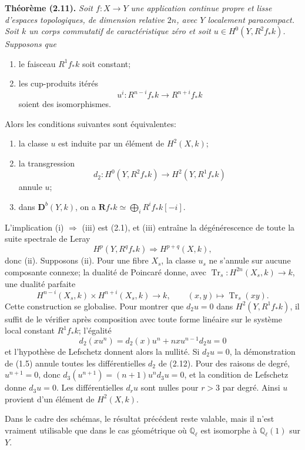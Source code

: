 \documentclass[11pt]{article}
\DeclareMathOperator{\Tr}{Tr}
\newcommand{\bD}{\mathbf D}
\newcommand{\bR}{\mathbf R}
\newcommand{\Ql}{\mathbb Q_\ell}
\newenvironment{named}[1]{\par\medskip\noindent\textbf{#1}\itshape}{\par\medskip}
\begin{document}
\begin{named}{Théorème (2.11).}
Soit $f:X\to Y$ une application continue propre et lisse d'espaces topologiques, de dimension relative $2n$, avec $Y$ localement paracompact. Soit $k$ un corps commutatif de caractéristique zéro et soit $u\in H^0(Y,R^2f_*k)$. Supposons que
\begin{enumerate}[label=\alph*)]
\item le faisceau $R^1f_*k$ soit constant;
\item les cup-produits itérés
\[
u^i:R^{n-i}f_*k\longrightarrow R^{n+i}f_*k
\]
soient des isomorphismes.
\end{enumerate}
Alors les conditions suivantes sont équivalentes:
\begin{enumerate}[label=(\roman*)]
\item la classe $u$ est induite par un élément de $H^2(X,k)$;
\item la transgression
\[
d_2:H^0(Y,R^2f_*k)\longrightarrow H^2(Y,R^1f_*k)
\]
annule $u$;
\item dans $\bD^b(Y,k)$, on a $\bR f_*k\simeq\bigoplus_iR^if_*k[-i]$.
\end{enumerate}
\end{named}
L'implication (i) $\Rightarrow$ (iii) est (2.1), et (iii) entraîne la dégénérescence de toute la suite spectrale de Leray
\begin{equation}\tag{2.12}
H^p(Y,R^qf_*k)\Longrightarrow H^{p+q}(X,k),
\end{equation}
donc (ii). Supposons (ii). Pour une fibre $X_s$, la classe $u_s$ ne s'annule sur aucune composante connexe; la dualité de Poincaré donne, avec $\Tr_s:H^{2n}(X_s,k)\to k$, une dualité parfaite
\[
H^{n-i}(X_s,k)\times H^{n+i}(X_s,k)\longrightarrow k,
\qquad (x,y)\mapsto \Tr_s(xy).
\]
Cette construction se globalise. Pour montrer que $d_2u=0$ dans $H^2(Y,R^1f_*k)$, il suffit de le vérifier après composition avec toute forme linéaire sur le système local constant $R^1f_*k$; l'égalité
\[
d_2(xu^n)=d_2(x)u^n+n x u^{n-1}d_2u=0
\]
et l'hypothèse de Lefschetz donnent alors la nullité. Si $d_2u=0$, la démonstration de (1.5) annule toutes les différentielles $d_2$ de (2.12). Pour des raisons de degré, $u^{n+1}=0$, donc $d_3(u^{n+1})=(n+1)u^nd_3u=0$, et la condition de Lefschetz donne $d_3u=0$. Les différentielles $d_r u$ sont nulles pour $r>3$ par degré. Ainsi $u$ provient d'un élément de $H^2(X,k)$.

Dans le cadre des schémas, le résultat précédent reste valable, mais il n'est vraiment utilisable que dans le cas géométrique où $\Ql$ est isomorphe à $\Ql(1)$ sur $Y$.
\end{document}
